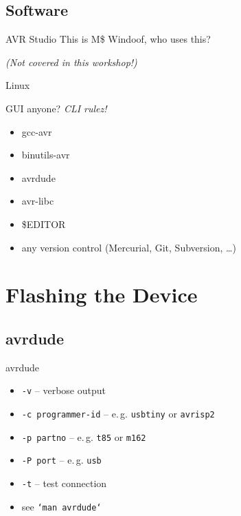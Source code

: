 \documentclass{beamer}
\begin{document}

\subsection{Software}

\begin{frame}{AVR Studio}
    This is M\$ Windoof, who uses this?

    \pause

    \emph{(Not covered in this workshop!)}
\end{frame}

\begin{frame}{Linux}
    \begin{block}{GUI anyone?}
        \emph{CLI rulez!}
    \end{block}
    \begin{itemize}
        \item gcc-avr
        \item binutils-avr
        \item avrdude
        \item avr-libc
        \item \$EDITOR
        \item any version control (Mercurial, Git, Subversion, …)
    \end{itemize}
\end{frame}

\section{Flashing the Device}

\subsection{avrdude}

\begin{frame}{avrdude}
    \begin{itemize}
        \item<1-5> \texttt{-v} -- verbose output
        \item<2-5> \texttt{-c programmer-id} -- e.\,g. \texttt{usbtiny} or \texttt{avrisp2}
        \item<3-5> \texttt{-p partno} -- e.\,g. \texttt{t85} or \texttt{m162}
        \item<4-5> \texttt{-P port} -- e.\,g. \texttt{usb}
        \item<5> \texttt{-t} -- test connection
        \item<6> see \texttt{`man avrdude`}
    \end{itemize}
\end{frame}
\end{document}
